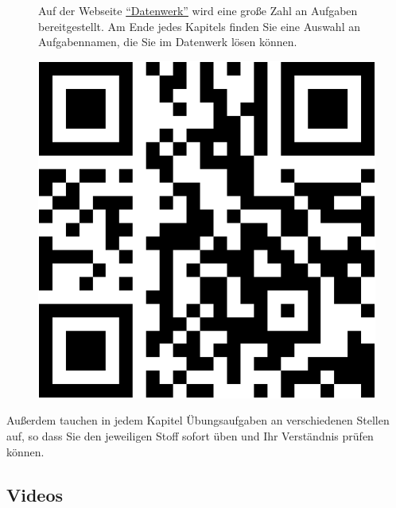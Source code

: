 \documentclass[
  letterpaper,
]{scrbook}
\theoremstyle{definition}
\theoremstyle{definition}
\theoremstyle{definition}
\theoremstyle{remark}
\begin{document}
\begin{figure}

\begin{minipage}{0.80\linewidth}
Auf der Webseite \href{https://datenwerk.netlify.app/}{``Datenwerk''}
wird eine große Zahl an Aufgaben bereitgestellt. Am Ende jedes Kapitels
finden Sie eine Auswahl an Aufgabennamen, die Sie im Datenwerk lösen
können.\end{minipage}%
%
\begin{minipage}{0.20\linewidth}

\begin{center}
\includegraphics[width=0.75\linewidth,height=\textheight,keepaspectratio]{005-orga_files/figure-pdf/unnamed-chunk-3-1.pdf}
\end{center}

\end{minipage}%

\end{figure}%

Außerdem tauchen in jedem Kapitel Übungsaufgaben an verschiedenen
Stellen auf, so dass Sie den jeweiligen Stoff sofort üben und Ihr
Verständnis prüfen können.

\subsection{Videos}\label{videos}
\end{document}
